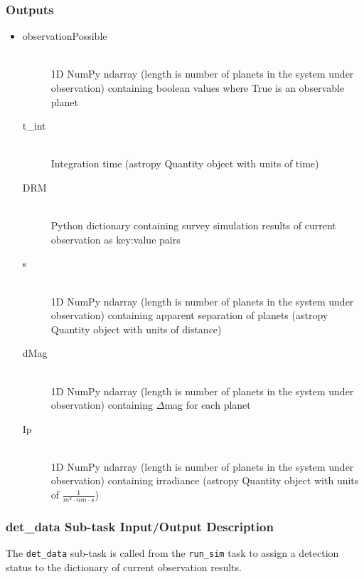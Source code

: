 \documentclass[cleanfoot]{asme2ej}
\begin{document}
\subsubsection*{Outputs}
\begin{itemize}
    \item 
    \begin{description}
        \item[observationPossible] \hfill \\
        1D NumPy ndarray (length is number of planets in the system under observation) containing boolean values where True is an observable planet
        \item[t\_int] \hfill \\
        Integration time (astropy Quantity object with units of time)
        \item[DRM] \hfill \\
        Python dictionary containing survey simulation results of current observation as key:value pairs
        \item[s] \hfill \\
        1D NumPy ndarray (length is number of planets in the system under observation) containing apparent separation of planets (astropy Quantity object with units of distance)
        \item[dMag] \hfill \\
        1D NumPy ndarray (length is number of planets in the system under observation) containing $ \Delta $mag for each planet
        \item[Ip] \hfill \\
        1D NumPy ndarray (length is number of planets in the system under observation) containing irradiance (astropy Quantity object with units of $ \frac{1}{m^2 \cdot nm \cdot s} $)
    \end{description}
\end{itemize}

\subsubsection{det\_data Sub-task Input/Output Description} \label{sec:detdatatask}
The \verb+det_data+ sub-task is called from the \verb+run_sim+ task to assign a detection status to the dictionary of current observation results.
\end{document}
